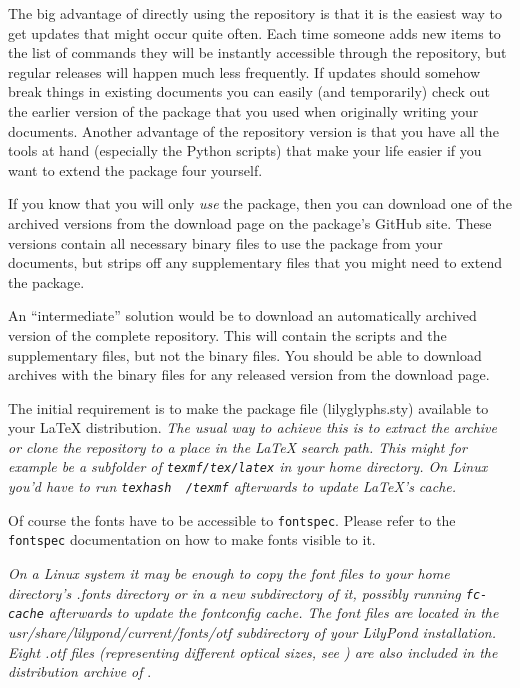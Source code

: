 \documentclass{OLLbook}
\begin{document}
The big advantage of directly using the repository is that it is the easiest way to get updates that might occur quite often. 
Each time someone adds new items to the list of commands they will be instantly accessible through the repository, but regular releases will happen much less frequently.
If updates should somehow break things in existing documents you can easily (and temporarily) check out the earlier version of the package that you used when originally writing your documents.
Another advantage of the repository version is that you have all the tools at hand (especially the Python scripts) that make your life easier if you want to extend the package four yourself.

If you know that you will only \emph{use} the \lilyglyphs package, then you can download one of the archived versions from the download page on the package's GitHub site.
These versions contain all necessary binary files to use the package from your documents, but strips off any supplementary files that you might need to extend the package.

An “intermediate” solution would be to download an automatically archived version of the complete repository. 
This will contain the scripts and the supplementary files, but not the binary files.
You should be able to download archives with the binary files for any released version from the download page.

\medskip
The initial requirement is to make the package file (lilyglyphs.sty) available to your \LaTeX{} distribution. \textit{The usual way to achieve this is to extract the archive or clone the repository to a place in the \LaTeX{} search path. This might for example be a subfolder of \texttt{texmf/tex/latex} in your home directory. On Linux you'd have to run \texttt{texhash ~/texmf} afterwards to update \LaTeX's cache.}

Of course the fonts have to be accessible to \texttt{fontspec}. 
Please refer to the \texttt{fontspec} documentation on how to make fonts visible to it. 

\textit{On a Linux system it may be enough to copy the \emmentaler font files to your home directory's .fonts directory or in a new subdirectory of it, possibly running \texttt{fc-cache} afterwards to update the fontconfig cache. 
The font files are located in the usr/share/lilypond/current/fonts/otf subdirectory of your LilyPond installation. 
Eight .otf files (representing different optical sizes, see ) are also included in the distribution archive of \lilyglyphs}.
\end{document}
